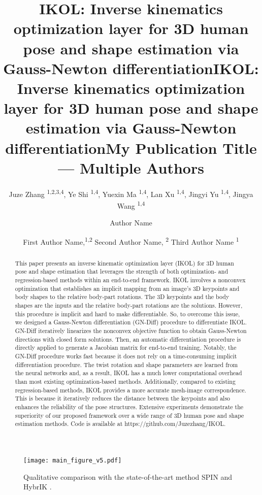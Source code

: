 \documentclass[letterpaper]{article} \usepackage{aaai23}  \usepackage{times}  \usepackage{helvet}  \usepackage{courier}  \usepackage[hyphens]{url}  \usepackage{graphicx} \urlstyle{rm} \def\UrlFont{\rm}  \usepackage{natbib}  \usepackage{caption} \frenchspacing  \setlength{\pdfpagewidth}{8.5in}  \setlength{\pdfpageheight}{11in}  \usepackage{algorithm}
\title{IKOL: Inverse kinematics optimization layer for 3D human pose and shape estimation via Gauss-Newton differentiation}
\author {
Juze Zhang \textsuperscript{\rm 1,\rm 2,\rm 3,\rm 4},
    Ye Shi \textsuperscript{\rm 1,\rm 4}\equalcontrib,
    Yuexin Ma \textsuperscript{\rm 1,\rm 4},
    Lan Xu \textsuperscript{\rm 1,\rm 4},
    Jingyi Yu \textsuperscript{\rm 1,\rm 4},
    Jingya Wang \textsuperscript{\rm 1,\rm 4}\equalcontrib
}
\title{IKOL: Inverse kinematics optimization layer for 3D human pose and shape estimation via Gauss-Newton differentiation}
\author {
    Author Name
}
\title{My Publication Title --- Multiple Authors}
\author {
First Author Name,\textsuperscript{\rm 1,\rm 2}
    Second Author Name, \textsuperscript{\rm 2}
    Third Author Name \textsuperscript{\rm 1}
}
\begin{document}
\maketitle

\begin{abstract}
This paper presents an inverse kinematic optimization layer (IKOL) for 3D human pose and shape estimation that leverages the strength of both optimization- and regression-based methods within an end-to-end framework. IKOL involves a nonconvex optimization that establishes an implicit mapping from an image’s 3D keypoints and body shapes to the relative body-part rotations. The 3D keypoints and the body shapes are the inputs and the relative body-part rotations are the solutions. However, this procedure is implicit and hard to make differentiable. So, to overcome this issue, we designed a Gauss-Newton differentiation (GN-Diff) procedure to differentiate IKOL. GN-Diff iteratively linearizes the nonconvex objective function to obtain Gauss-Newton directions with closed form solutions. Then, an automatic differentiation procedure is directly applied to generate a Jacobian matrix for end-to-end training. Notably, the GN-Diff procedure works fast because it does not rely on a time-consuming implicit differentiation procedure. The twist rotation and shape parameters are learned from the neural networks and, as a result, IKOL has a much lower computational overhead than most existing optimization-based methods. Additionally, compared to existing regression-based methods, IKOL provides a more accurate mesh-image correspondence. This is because it iteratively reduces the distance between the keypoints and also enhances the reliability of the pose structures. Extensive experiments demonstrate the superiority of our proposed framework over a wide range of 3D human pose and shape estimation methods. Code is available at https://github.com/Juzezhang/IKOL.
\end{abstract}

\begin{figure}[t]
\centering
	\texttt{[image: main\_figure\_v5.pdf]}
\caption{Qualitative comparison with the state-of-the-art method SPIN \cite{kolotouros2019learning} and HybrIK \cite{li2021hybrik}.}
\label{Overview}
\end{figure}
\end{document}
